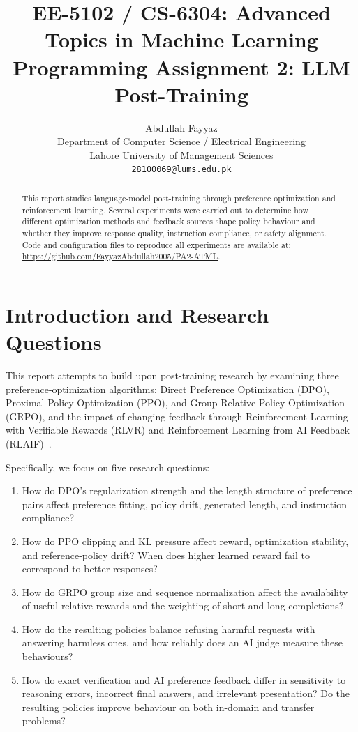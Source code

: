 \documentclass{article}
\title{EE-5102 / CS-6304: Advanced Topics in Machine Learning\\Programming Assignment 2: LLM Post-Training}
\author{%
Abdullah Fayyaz \\
Department of Computer Science / Electrical Engineering \\
Lahore University of Management Sciences \\
\texttt{28100069@lums.edu.pk} \\
}
\begin{document}
\maketitle

\begin{abstract}
This report studies language-model post-training through preference optimization and reinforcement learning. Several experiments were carried out to determine how different optimization methods and feedback sources shape policy behaviour and whether they improve response quality, instruction compliance, or safety alignment. Code and configuration files to reproduce all experiments are available at: \url{https://github.com/FayyazAbdullah2005/PA2-ATML}.
\end{abstract}

\section{Introduction and Research Questions}
\label{sec:introduction}

This report attempts to build upon post-training research by examining three preference-optimization algorithms: Direct Preference Optimization (DPO), Proximal Policy Optimization (PPO), and Group Relative Policy Optimization (GRPO), and the impact of changing feedback through Reinforcement Learning with Verifiable Rewards (RLVR) and Reinforcement Learning from AI Feedback (RLAIF)~\cite{lee2024rlaif}.

Specifically, we focus on five research questions:
\begin{enumerate}
    \item How do DPO's regularization strength and the length structure of preference pairs affect preference fitting, policy drift, generated length, and instruction compliance?
    \item How do PPO clipping and KL pressure affect reward, optimization stability, and reference-policy drift? When does higher learned reward fail to correspond to better responses?
    \item How do GRPO group size and sequence normalization affect the availability of useful relative rewards and the weighting of short and long completions?
    \item How do the resulting policies balance refusing harmful requests with answering harmless ones, and how reliably does an AI judge measure these behaviours?
    \item How do exact verification and AI preference feedback differ in sensitivity to reasoning errors, incorrect final answers, and irrelevant presentation? Do the resulting policies improve behaviour on both in-domain and transfer problems?
\end{enumerate}
\end{document}
